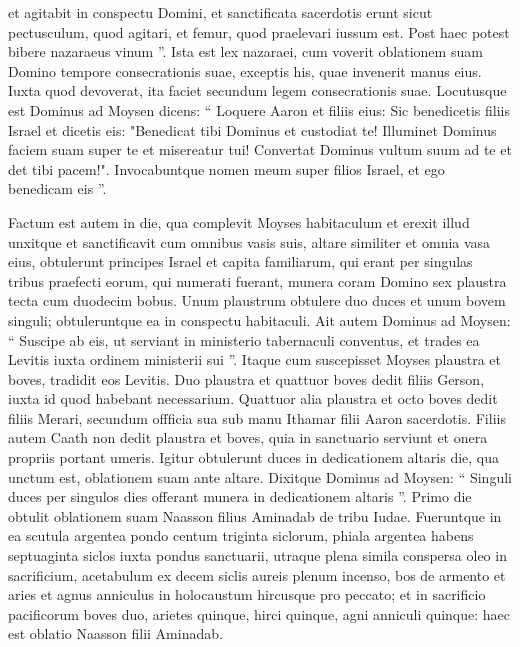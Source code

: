 \begin{biblechapter}
\begin{biblechapter}
\begin{biblechapter}
\begin{biblechapter}
\begin{biblechapter}
\begin{biblechapter}
\verse et agitabit in conspectu Domini, et sanctificata sacerdotis erunt sicut pectusculum, quod agitari, et femur, quod praelevari iussum est. Post haec potest bibere nazaraeus vinum ”.
 \verse Ista est lex nazaraei, cum voverit oblationem suam Domino tempore consecrationis suae, exceptis his, quae invenerit manus eius. Iuxta quod devoverat, ita faciet secundum legem consecrationis suae.
 \verse Locutusque est Dominus ad Moysen dicens: 
\verse “ Loquere Aaron et filiis eius: Sic benedicetis filiis Israel et dicetis eis:
 \verse "Benedicat tibi Dominus et custodiat te!
 \verse Illuminet Dominus faciem suam super te et misereatur tui!
 \verse Convertat Dominus vultum suum ad te et det tibi pacem!".
 \verse Invocabuntque nomen meum super filios Israel, et ego benedicam eis ”.
 
\begin{biblechapter}
\verse Factum est autem in die, qua complevit Moyses habitaculum et erexit illud unxitque et sanctificavit cum omnibus vasis suis, altare similiter et omnia vasa eius, 
\verse obtulerunt principes Israel et capita familiarum, qui erant per singulas tribus praefecti eorum, qui numerati fuerant, 
\verse munera coram Domino sex plaustra tecta cum duodecim bobus. Unum plaustrum obtulere duo duces et unum bovem singuli; obtuleruntque ea in conspectu habitaculi. 
\verse Ait autem Dominus ad Moysen: 
\verse “ Suscipe ab eis, ut serviant in ministerio tabernaculi conventus, et trades ea Levitis iuxta ordinem ministerii sui ”. 
\verse Itaque cum suscepisset Moyses plaustra et boves, tradidit eos Levitis. 
\verse Duo plaustra et quattuor boves dedit filiis Gerson, iuxta id quod habebant necessarium. 
\verse Quattuor alia plaustra et octo boves dedit filiis Merari, secundum offficia sua sub manu Ithamar filii Aaron sacerdotis. 
\verse Filiis autem Caath non dedit plaustra et boves, quia in sanctuario serviunt et onera propriis portant umeris.
 \verse Igitur obtulerunt duces in dedicationem altaris die, qua unctum est, oblationem suam ante altare. 
\verse Dixitque Dominus ad Moysen: “ Singuli duces per singulos dies offerant munera in dedicationem altaris ”.
 \verse Primo die obtulit oblationem suam Naasson filius Aminadab de tribu Iudae. 
 \verse Fueruntque in ea scutula argentea pondo centum triginta siclorum, phiala argentea habens septuaginta siclos iuxta pondus sanctuarii, utraque plena simila conspersa oleo in sacrificium, 
\verse acetabulum ex decem siclis aureis plenum incenso, 
\verse bos de armento et aries et agnus anniculus in holocaustum 
\verse hircusque pro peccato; 
\verse et in sacrificio pacificorum boves duo, arietes quinque, hirci quinque, agni anniculi quinque: haec est oblatio Naasson filii Aminadab.

\end{biblechapter}
\end{biblechapter}
\end{biblechapter}
\end{biblechapter}
\end{biblechapter}
\end{biblechapter}
\end{biblechapter}
